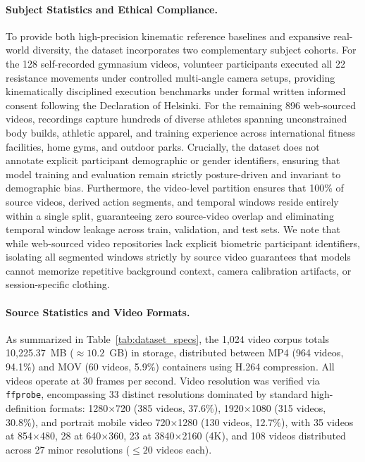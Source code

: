 \documentclass[runningheads]{llncs}
\begin{document}
\paragraph{Subject Statistics and Ethical Compliance.} To provide both high-precision kinematic reference baselines and expansive real-world diversity, the dataset incorporates two complementary subject cohorts. For the 128 self-recorded gymnasium videos, volunteer participants executed all 22 resistance movements under controlled multi-angle camera setups, providing kinematically disciplined execution benchmarks under formal written informed consent following the Declaration of Helsinki. For the remaining 896 web-sourced videos, recordings capture hundreds of diverse athletes spanning unconstrained body builds, athletic apparel, and training experience across international fitness facilities, home gyms, and outdoor parks. Crucially, the dataset does not annotate explicit participant demographic or gender identifiers, ensuring that model training and evaluation remain strictly posture-driven and invariant to demographic bias. Furthermore, the video-level partition ensures that 100\% of source videos, derived action segments, and temporal windows reside entirely within a single split, guaranteeing zero source-video overlap and eliminating temporal window leakage across train, validation, and test sets. We note that while web-sourced video repositories lack explicit biometric participant identifiers, isolating all segmented windows strictly by source video guarantees that models cannot memorize repetitive background context, camera calibration artifacts, or session-specific clothing.

\paragraph{Source Statistics and Video Formats.} As summarized in Table~\ref{tab:dataset_specs}, the 1,024 video corpus totals 10,225.37~MB ($\approx 10.2$~GB) in storage, distributed between MP4 (964 videos, 94.1\%) and MOV (60 videos, 5.9\%) containers using H.264 compression. All videos operate at 30 frames per second. Video resolution was verified via \texttt{ffprobe}, encompassing 33 distinct resolutions dominated by standard high-definition formats: 1280$\times$720 (385 videos, 37.6\%), 1920$\times$1080 (315 videos, 30.8\%), and portrait mobile video 720$\times$1280 (130 videos, 12.7\%), with 35 videos at 854$\times$480, 28 at 640$\times$360, 23 at 3840$\times$2160 (4K), and 108 videos distributed across 27 minor resolutions ($\le 20$ videos each).
\end{document}
